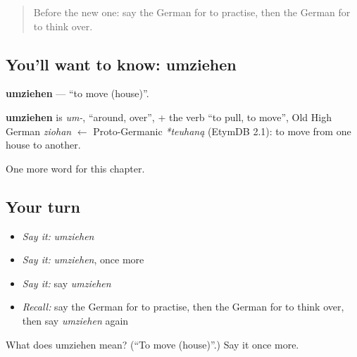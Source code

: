 \begin{quote}
Before the new one: say the German for to practise, then the German for to think over.
\end{quote}

\subsection*{You'll want to know: umziehen}
\textbf{umziehen} — \textquotedblleft{}to move (house)\textquotedblright{}.

\begin{cousinweb}
\textbf{umziehen} is \emph{um-}, \textquotedblleft{}around, over\textquotedblright{}, + the verb \textquotedblleft{}to pull, to move\textquotedblright{}, Old High German \emph{ziohan} $\leftarrow$ Proto-Germanic \emph{*teuhaną} (EtymDB 2.1): to move from one house to another.
\end{cousinweb}

\begin{grammarlens}[title={What you've built}]
One more word for this chapter.
\end{grammarlens}

\subsection*{Your turn}
\begin{itemize}
\raggedright
  \item \emph{Say it:} \emph{umziehen}
  \item \emph{Say it:} \emph{umziehen}, once more
  \item \emph{Say it:} say \emph{umziehen}
  \item \emph{Recall:} say the German for to practise, then the German for to think over, then say \emph{umziehen} again
\end{itemize}

\begin{tcolorbox}[breakable,colback=teal!4,colframe=teal!35!black,title={Before you move on}]
What does umziehen mean? (\textquotedblleft{}To move (house)\textquotedblright{}.) Say it once more.
\end{tcolorbox}

